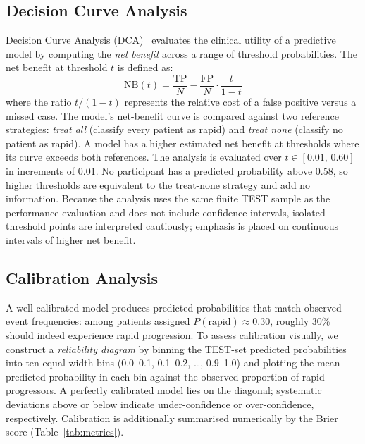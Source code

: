 \subsection{Decision Curve Analysis}
\label{subsec:methods_dca}
Decision Curve Analysis (\gls{DCA})~\cite{vickers2006dca} evaluates the clinical utility of a predictive model by computing the \textit{net benefit} across a range of threshold probabilities.
The net benefit at threshold $t$ is defined as:
\begin{equation}
  \text{NB}(t) = \frac{\text{TP}}{N} - \frac{\text{FP}}{N} \cdot \frac{t}{1-t}
  \label{eq:net_benefit}
\end{equation}
where the ratio $t/(1-t)$ represents the relative cost of a false positive versus a missed case.
The model's net-benefit curve is compared against two reference strategies: \textit{treat all} (classify every patient as rapid) and \textit{treat none} (classify no patient as rapid).
A model has a higher estimated net benefit at thresholds where its curve exceeds both references.
The analysis is evaluated over $t \in [0.01,\, 0.60]$ in increments of 0.01.
No participant has a predicted probability above 0.58, so higher thresholds are equivalent to the treat-none strategy and add no information.
Because the analysis uses the same finite TEST sample as the performance evaluation and does not include confidence intervals, isolated threshold points are interpreted cautiously; emphasis is placed on continuous intervals of higher net benefit.

\subsection{Calibration Analysis}
\label{subsec:methods_calibration}
A well-calibrated model produces predicted probabilities that match observed event frequencies: among patients assigned $P(\text{rapid}) \approx 0.30$, roughly 30\% should indeed experience rapid progression.
To assess calibration visually, we construct a \textit{reliability diagram} by binning the \gls{TEST}-set predicted probabilities into ten equal-width bins (0.0--0.1, 0.1--0.2, \ldots, 0.9--1.0) and plotting the mean predicted probability in each bin against the observed proportion of rapid progressors.
A perfectly calibrated model lies on the diagonal; systematic deviations above or below indicate under-confidence or over-confidence, respectively.
Calibration is additionally summarised numerically by the Brier score (Table~\ref{tab:metrics}).

